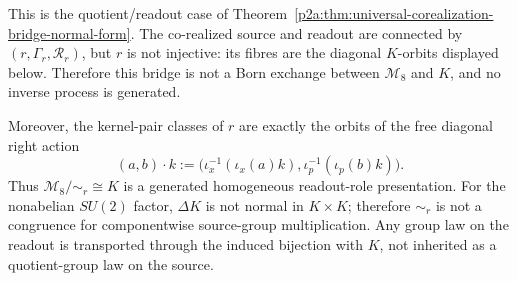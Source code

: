 \documentclass[12pt,a4paper]{article}
\begin{document}
\begin{theorem}
This is the quotient/readout case of
Theorem~\ref{p2a:thm:universal-corealization-bridge-normal-form}.  The
co-realized source and readout are connected by
\((r,\Gamma_r,\mathcal R_r)\), but \(r\) is not injective: its fibres are the
diagonal \(K\)-orbits displayed below.  Therefore this bridge is not a Born
exchange between \(\mathcal M_8\) and \(K\), and no inverse process is
generated.

Moreover, the kernel-pair classes of \(r\) are exactly the orbits of the free
diagonal right action
\[
 (a,b)\cdot k
 :=\bigl(\iota_x^{-1}(\iota_x(a)k),
         \iota_p^{-1}(\iota_p(b)k)\bigr).
\]
Thus \(\mathcal M_8/{\sim_r}\cong K\) is a generated homogeneous
readout-role presentation.  For the nonabelian \(SU(2)\) factor,
\(\Delta K\) is not normal in \(K\times K\); therefore \(\sim_r\) is not a
congruence for componentwise source-group multiplication.  Any group law on
the readout is transported through the induced bijection with \(K\), not
inherited as a quotient-group law on the source.
\end{theorem}
\end{document}
